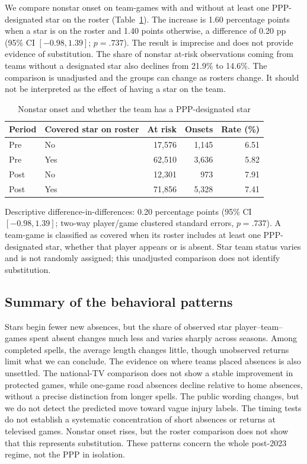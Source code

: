 \documentclass[11pt]{article}
\begin{document}
We compare nonstar onset on team-games with and without at least one PPP-designated star on the roster (Table~\ref{tab:nonstarcover}). The increase is 1.60 percentage points when a star is on the roster and 1.40 points otherwise, a difference of 0.20 pp (95\% CI $[-0.98,1.39]$; $p=.737$). The result is imprecise and does not provide evidence of substitution. The share of nonstar at-risk observations coming from teams without a designated star also declines from 21.9\% to 14.6\%. The comparison is unadjusted and the groups can change as rosters change. It should not be interpreted as the effect of having a star on the team.

\begin{table}[!htbp]\centering\caption{Nonstar onset and whether the team has a PPP-designated star}\label{tab:nonstarcover}\small
\begin{tabular}{@{}llrrr@{}}\toprule
Period & Covered star on roster & At risk & Onsets & Rate (\%)\\\midrule
Pre & No & 17,576 & 1,145 & 6.51\\
Pre & Yes & 62,510 & 3,636 & 5.82\\
Post & No & 12,301 & 973 & 7.91\\
Post & Yes & 71,856 & 5,328 & 7.41\\\bottomrule
\end{tabular}\par\smallskip\raggedright\footnotesize Descriptive difference-in-differences: 0.20 percentage points (95\% CI $[-0.98,1.39]$; two-way player/game clustered standard errors, $p = .737$). A team-game is classified as covered when its roster includes at least one PPP-designated star, whether that player appears or is absent. Star team status varies and is not randomly assigned; this unadjusted comparison does not identify substitution.
\end{table}

\FloatBarrier
\subsection{Summary of the behavioral patterns}

Stars begin fewer new absences, but the share of observed star player--team--games spent absent changes much less and varies sharply across seasons. Among completed spells, the average length changes little, though unobserved returns limit what we can conclude. The evidence on where teams placed absences is also unsettled. The national-TV comparison does not show a stable improvement in protected games, while one-game road absences decline relative to home absences, without a precise distinction from longer spells. The public wording changes, but we do not detect the predicted move toward vague injury labels. The timing tests do not establish a systematic concentration of short absences or returns at televised games. Nonstar onset rises, but the roster comparison does not show that this represents substitution. These patterns concern the whole post-2023 regime, not the PPP in isolation.
\end{document}
